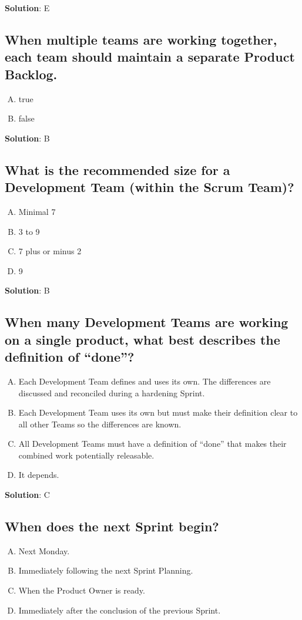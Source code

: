 \textbf{Solution}: E


\subsection{When multiple teams are working together, each team should maintain a separate Product Backlog.}
\begin{enumerate}[A)]
  \item true
  \item false
\end{enumerate}


\textbf{Solution}: B


\subsection{What is the recommended size for a Development Team (within the Scrum Team)?}
\begin{enumerate}[A)]
  \item Minimal 7
  \item 3 to 9
  \item 7 plus or minus 2
  \item 9
\end{enumerate}


\textbf{Solution}: B


\subsection{When many Development Teams are working on a single product, what best describes the definition of \enquote{done}?}
\begin{enumerate}[A)]
  \item Each Development Team defines and uses its own. The differences are discussed and reconciled during a hardening Sprint.
  \item Each Development Team uses its own but must make their definition clear to all other Teams so the differences are known.
  \item All Development Teams must have a definition of \enquote{done} that makes their combined work potentially releasable.
  \item It depends.
\end{enumerate}


\textbf{Solution}: C


\subsection{When does the next Sprint begin?}
\begin{enumerate}[A)]
  \item Next Monday.
  \item Immediately following the next Sprint Planning.
  \item When the Product Owner is ready.
  \item Immediately after the conclusion of the previous Sprint.
\end{enumerate}


